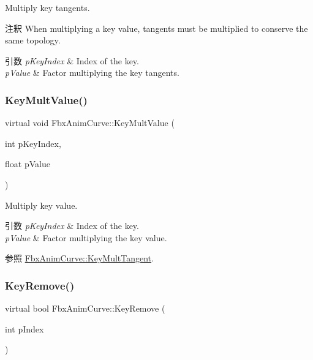 Multiply key tangents. \begin{DoxyRemark}{注釈}
When multiplying a key value, tangents must be multiplied to conserve the same topology. 
\end{DoxyRemark}

\begin{DoxyParams}{引数}
{\em p\+Key\+Index} & Index of the key. \\
\hline
{\em p\+Value} & Factor multiplying the key tangents. \\
\hline
\end{DoxyParams}
\mbox{\label{class_fbx_anim_curve_a73262cd3affc5c9d098fda9a35a37779}} 
\subsubsection{\texorpdfstring{Key\+Mult\+Value()}{KeyMultValue()}}
{\footnotesize\ttfamily virtual void Fbx\+Anim\+Curve\+::\+Key\+Mult\+Value (\begin{DoxyParamCaption}\item[{int}]{p\+Key\+Index,  }\item[{float}]{p\+Value }\end{DoxyParamCaption})\hspace{0.3cm}{\ttfamily [pure virtual]}}

Multiply key value. 
\begin{DoxyParams}{引数}
{\em p\+Key\+Index} & Index of the key. \\
\hline
{\em p\+Value} & Factor multiplying the key value. \\
\hline
\end{DoxyParams}
\begin{DoxySeeAlso}{参照}
\hyperlink{class_fbx_anim_curve_a743514eebf5845d6bc13145e082a8ae5}{Fbx\+Anim\+Curve\+::\+Key\+Mult\+Tangent}. 
\end{DoxySeeAlso}
\mbox{\label{class_fbx_anim_curve_a083206eda111aa4c6803410427a4645c}} 
\subsubsection{\texorpdfstring{Key\+Remove()}{KeyRemove()}\hspace{0.1cm}{\footnotesize\ttfamily [1/2]}}
{\footnotesize\ttfamily virtual bool Fbx\+Anim\+Curve\+::\+Key\+Remove (\begin{DoxyParamCaption}\item[{int}]{p\+Index }\end{DoxyParamCaption})\hspace{0.3cm}{\ttfamily [pure virtual]}}

